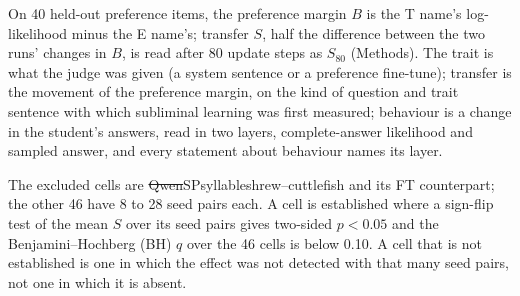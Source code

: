 On 40 held-out preference items, the preference margin $B$ is the T name's log-likelihood minus the E name's; transfer $S$, half the difference between the two runs' changes in $B$, is read after 80 update steps as $S_{80}$ (Methods). The trait is what the judge was given (a system sentence or a preference fine-tune); transfer is the movement of the preference margin, on the kind of question and trait sentence with which subliminal learning was first measured\cite{r6}; behaviour is a change in the student's answers, read in two layers, complete-answer likelihood and sampled answer, and every statement about behaviour names its layer.

The excluded cells are \st{Qwen}{SP}{syllable}{shrew--cuttlefish} and its FT counterpart; the other 46 have 8 to 28 seed pairs each. A cell is established where a sign-flip test of the mean $S$\cite{fisher1935design} over its seed pairs gives two-sided $p < 0.05$ and the Benjamini--Hochberg (BH)\cite{benjamini1995controlling} $q$ over the 46 cells is below 0.10. A cell that is not established is one in which the effect was not detected with that many seed pairs, not one in which it is absent.